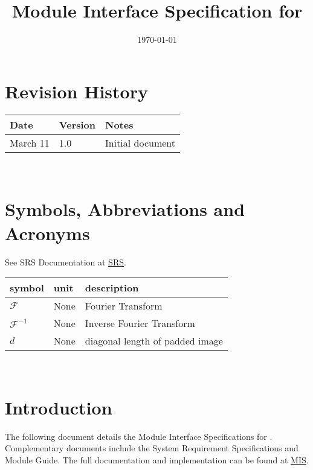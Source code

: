 \documentclass[12pt, titlepage]{article}
\begin{document}
\title{Module Interface Specification for \progname{}}

\author{\authname}

\date{\today}

\maketitle


\section{Revision History}

\begin{tabularx}{\textwidth}{p{3cm}p{2cm}X}
\toprule {\bf Date} & {\bf Version} & {\bf Notes}\\
\midrule
March 11 & 1.0 & Initial document\\
\bottomrule
\end{tabularx}

~\newpage

\section{Symbols, Abbreviations and Acronyms}

See SRS Documentation at \href{https://github.com/marischan888/FBP-CT/blob/main/docs/SRS/SRS.pdf}{SRS}.

\noindent \begin{tabular}{l l l}
\toprule
\textbf{symbol} & \textbf{unit} & \textbf{description}\\
\midrule
$\mathcal{F}$ & None & Fourier Transform \\
$\mathcal{F}^{-1}$ & None & Inverse Fourier Transform \\
$d$ & None & diagonal length of padded image \\
\bottomrule
\end{tabular}\\

\newpage

\tableofcontents

\newpage


\section{Introduction}

The following document details the Module Interface Specifications for \progname.
Complementary documents include the System Requirement Specifications
and Module Guide.  The full documentation and implementation can be
found at \href{https://github.com/marischan888/FBP-CT/tree/main/docs/Design/SoftDetailedDes}{MIS}.
\end{document}
